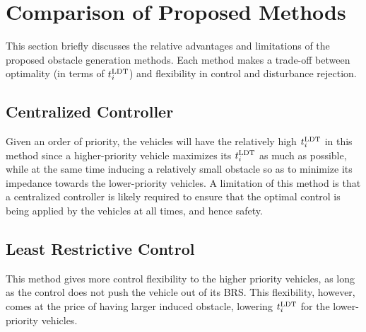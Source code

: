 %

\section{Comparison of Proposed Methods}
\vspace{-0.2em}
This section briefly discusses the relative advantages and limitations of the proposed obstacle generation methods. Each method makes a trade-off between optimality (in terms of $t^\text{LDT}_i$) and flexibility in control and disturbance rejection.

\subsection{Centralized Controller}
Given an order of priority, the vehicles will have the relatively high $t^\text{LDT}_i$ in this method since a higher-priority vehicle maximizes its $t^\text{LDT}_i$ as much as possible, while at the same time inducing a relatively small obstacle so as to minimize its impedance towards the lower-priority vehicles. 
A limitation of this method is that a centralized controller is likely required to ensure that the optimal control is being applied by the vehicles at all times, and hence safety.

\subsection{Least Restrictive Control}
This method gives more control flexibility to the higher priority vehicles, as long as the control does not push the vehicle out of its BRS. This flexibility, however, comes at the price of having larger induced obstacle, lowering $t^\text{LDT}_i$ for the lower-priority vehicles.  

